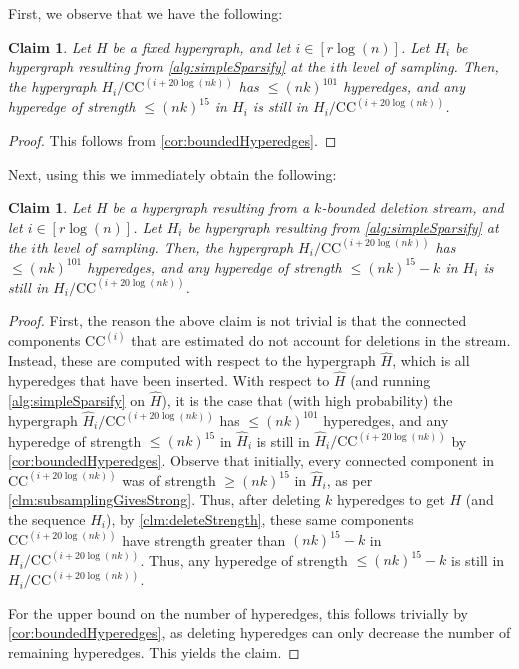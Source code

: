 \documentclass[11pt]{article}
\newtheorem{claim}[theorem]{Claim}
\theoremstyle{definition}
\begin{document}
First, we observe that we have the following:

\begin{claim}
		Let $H$ be a fixed hypergraph, and let $i \in [r \log(n)]$. Let $H_i$ be hypergraph resulting from \cref{alg:simpleSparsify} at the $i$th level of sampling. Then, the hypergraph $H_i /  \mathrm{CC}^{(i + 20 \log(nk))}$ has $\leq (nk)^{101}$ hyperedges, and any hyperedge of strength $\leq (nk)^{15}$ in $H_i$ is still in $H_i /  \mathrm{CC}^{(i + 20 \log(nk))}$.
\end{claim}

\begin{proof}
This follows from \cref{cor:boundedHyperedges}.
\end{proof}

Next, using this we immediately obtain the following:

\begin{claim}\label{clm:respectLowStrength}
	Let $H$ be a hypergraph resulting from a $k$-bounded deletion stream, and let $i \in [r \log(n)]$. Let $H_i$ be hypergraph resulting from \cref{alg:simpleSparsify} at the $i$th level of sampling. Then, the hypergraph $H_i /  \mathrm{CC}^{(i + 20 \log(nk))}$ has $\leq (nk)^{101}$ hyperedges, and any hyperedge of strength $\leq (nk)^{15} - k$ in $H_i$ is still in $H_i /  \mathrm{CC}^{(i + 20 \log(nk))}$.
\end{claim}

\begin{proof}
First, the reason the above claim is not trivial is that the connected components $\mathrm{CC}^{(i)}$ that are estimated do not account for deletions in the stream. Instead, these are computed with respect to the hypergraph $\hat{H}$, which is all hyperedges that have been inserted. With respect to $\hat{H}$ (and running \cref{alg:simpleSparsify} on $\hat{H}$), it is the case that (with high probability) the hypergraph $\hat{H}_i /  \mathrm{CC}^{(i + 20 \log(nk))}$ has $\leq (nk)^{101}$ hyperedges, and any hyperedge of strength $\leq (nk)^{15}$ in $\hat{H}_i$ is still in $\hat{H}_i /  \mathrm{CC}^{(i + 20 \log(nk))}$ by \cref{cor:boundedHyperedges}. Observe that initially, every connected component in $\mathrm{CC}^{(i + 20 \log(nk))}$ was of strength $\geq (nk)^{15}$ in $\hat{H}_i$, as per \cref{clm:subsamplingGivesStrong}. Thus, after deleting $k$ hyperedges to get $H$ (and the sequence $H_i$), by \cref{clm:deleteStrength}, these same components $\mathrm{CC}^{(i + 20 \log(nk))}$ have strength greater than $(nk)^{15} - k$ in $H_i /\mathrm{CC}^{(i + 20 \log(nk))}$. Thus, any hyperedge of strength $\leq (nk)^{15} - k$ is still in $H_i /  \mathrm{CC}^{(i + 20 \log(nk))}$.

For the upper bound on the number of hyperedges, this follows trivially by \cref{cor:boundedHyperedges}, as deleting hyperedges can only decrease the number of remaining hyperedges. This yields the claim.
\end{proof}
\end{document}
